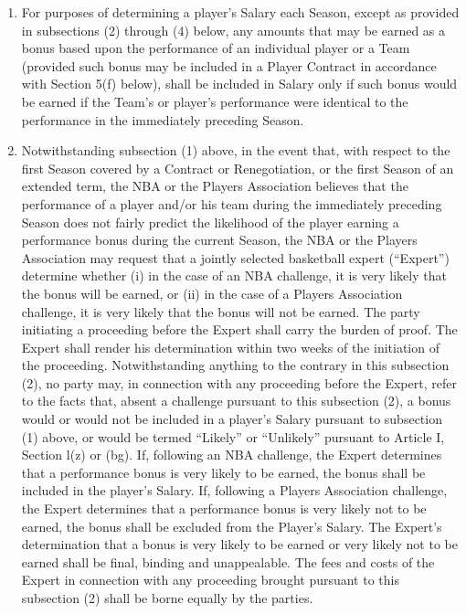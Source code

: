 \documentclass[
]{book}
\providecommand{\tightlist}{%
  \setlength{\itemsep}{0pt}\setlength{\parskip}{0pt}}
\begin{document}
\begin{enumerate}
  \begin{enumerate}
  \def\labelenumii{(\arabic{enumii})}
  \tightlist
  \item
    For purposes of determining a player's Salary each Season, except as provided in subsections (2) through (4) below, any amounts that may be earned as a bonus based upon the performance of an individual player or a Team (provided such bonus may be included in a Player Contract in accordance with Section 5(f) below), shall be included in Salary only if such bonus would be earned if the Team's or player's performance were identical to the performance in the immediately preceding Season.
  \item
    Notwithstanding subsection (1) above, in the event that, with respect to the first Season covered by a Contract or Renegotiation, or the first Season of an extended term, the NBA or the Players Association believes that the performance of a player and/or his team during the immediately preceding Season does not fairly predict the likelihood of the player earning a performance bonus during the current Season, the NBA or the Players Association may request that a jointly selected basketball expert (``Expert'') determine whether (i) in the case of an NBA challenge, it is very likely that the bonus will be earned, or (ii) in the case of a Players Association challenge, it is very likely that the bonus will not be earned. The party initiating a proceeding before the Expert shall carry the burden of proof. The Expert shall render his determination within two weeks of the initiation of the proceeding. Notwithstanding anything to the contrary in this subsection (2), no party may, in connection with any proceeding before the Expert, refer to the facts that, absent a challenge pursuant to this subsection (2), a bonus would or would not be included in a player's Salary pursuant to subsection (1) above, or would be termed ``Likely'' or ``Unlikely'' pursuant to Article I, Section l(z) or (bg). If, following an NBA challenge, the Expert determines that a performance bonus is very likely to be earned, the bonus shall be included in the player's Salary. If, following a Players Association challenge, the Expert determines that a performance bonus is very likely not to be earned, the bonus shall be excluded from the Player's Salary. The Expert's determination that a bonus is very likely to be earned or very likely not to be earned shall be final, binding and unappealable. The fees and costs of the Expert in connection with any proceeding brought pursuant to this subsection (2) shall be borne equally by the parties.

\end{enumerate}
\end{enumerate}
\end{document}
